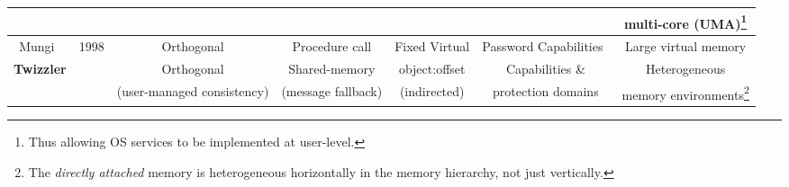 {\begin{table}
\begin{minipage}{\textwidth}
\begin{tabular}{c c c c c c c}
                                                                        &                                           &                                           &                        &                                                                               &                          & multi-core (UMA)\footnote{Thus allowing OS services to be implemented at user-level.} \\
                \midrule
                Mungi~\cite{heiser:scse9314,heiser:spe98}               & 1998                                      & Orthogonal                                & Procedure call         & Fixed
                Virtual                                                 & Password Capabilities~\cite{pose:acsac01} & Large virtual memory                                                                                                                                                                                                                                                  \\
                \midrule
                \textbf{Twizzler}                                       &                                           & Orthogonal                                & Shared-memory          & object:offset                                                                 & Capabilities \&          & Heterogeneous                                                                         \\
                                                                        &                                           & (user-managed consistency)                & (message fallback)     & (indirected)                                                                  & protection domains       & memory
                environments\footnote{The \emph{directly attached} memory is heterogeneous horizontally in the
                memory hierarchy, not just vertically.}                                                                                                                                                                                                                                                                                                                                     \\
            \end{tabular}
        \end{minipage}
    \end{table}




}
